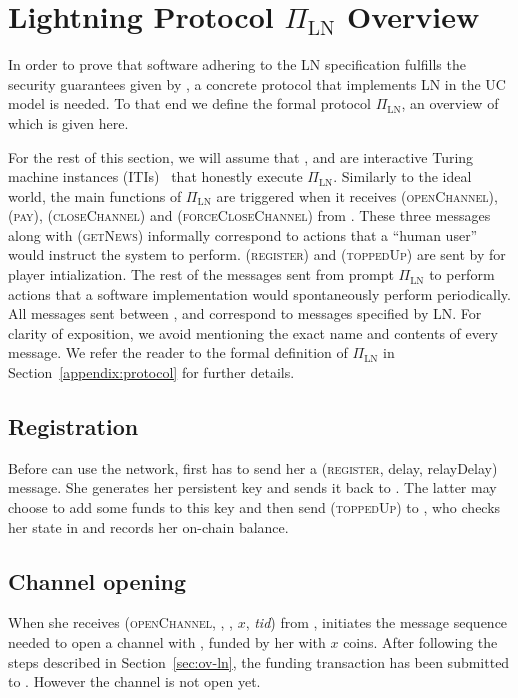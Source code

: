 \section{Lightning Protocol $\Pi_{\mathrm{LN}}$ Overview}
\label{sec:ov-protocol}

  In order to prove that software adhering to the LN specification
  fulfills the security guarantees given by \fpaynet, a concrete
  protocol that implements LN in the UC model is needed. To that end we
  define the formal protocol $\Pi_{\mathrm{LN}}$, an overview of which is given
  here.

  For the rest of this section, we will assume that \alice, \bob{} and
  \charlie{} are interactive Turing machine instances (ITIs)~\cite{uc}
  that honestly execute $\Pi_{\mathrm{LN}}$. Similarly to the ideal world, the
  main functions of $\Pi_{\mathrm{LN}}$ are triggered when it receives
  (\textsc{openChannel}), (\textsc{pay}), (\textsc{closeChannel}) and
  (\textsc{forceCloseChannel}) from \environment{}. These three messages along
  with (\textsc{getNews}) informally correspond to actions that a ``human user''
  would instruct the system to perform. (\textsc{register}) and
  (\textsc{toppedUp}) are sent by \environment{} for player intialization. The
  rest of the messages sent from \environment{} prompt $\Pi_{\mathrm{LN}}$ to
  perform actions that a software implementation would spontaneously perform
  periodically. All messages sent between \alice, \bob{} and \charlie{}
  correspond to messages specified by LN. For clarity of exposition, we avoid
  mentioning the exact name and contents of every message. We refer the reader
  to the formal definition of $\Pi_{\mathrm{LN}}$ in
  Section~\ref{appendix:protocol} for further
  details.

  \subsection{Registration}
    Before \alice{} can use the network, \environment{} first has to send her a
    (\textsc{register}, delay, relayDelay) message. She generates her
    persistent key and sends it back to \environment{}. The latter may choose to
    add some funds to this key and then send (\textsc{toppedUp}) to \alice, who
    checks her state in \ledger{} and records her on-chain balance.

  \subsection{Channel opening}
    When she receives (\textsc{openChannel}, \alice, \bob, $x$, \textit{tid})
    from \environment, \alice{} initiates the message sequence needed to open a
    channel with \bob, funded by her with $x$ coins. After following the
    steps described in Section~\ref{sec:ov-ln}, the funding transaction has been
    submitted to \ledger. However the channel is not open yet.

